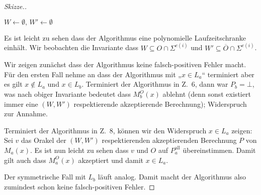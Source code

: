 \documentclass[nofonts]{uebung}
\begin{document}
\begin{proof}[Skizze.]
    \noindent%
    \begin{algorithm}[H]
        \;
        $W\gets\emptyset,\, W'\gets\emptyset$\;
    \end{algorithm}
Es ist leicht zu sehen dass der Algorithmus eine polynomielle Laufzeitschranke einhält.
Wir beobachten die Invariante dass $W\subseteq O\cap\Sigma^{e(i)}$ und $W'\subseteq \overline{O}\cap\Sigma^{e(i)}$. 

Wir zeigen zunächst dass der Algorithmus keine falsch-positiven Fehler macht.
Für den ersten Fall nehme an dass der Algorithmus mit „$x\in L_a$“ terminiert aber es gilt $x\not\in L_a$ und $x\in L_b$.
Terminiert der Algorithmus in Z.~6, dann war $P_b=\bot$, was nach obiger Invariante bedeutet dass $M_b^O(x)$ ablehnt (denn sonst existiert immer eine $(W, W')$ respektierende akzeptierende Berechnung); Widerspruch zur Annahme.

Terminiert der Algorithmus in Z.~8, können wir den Widerspruch $x\in L_a$ zeigen: Sei $v$ das Orakel der $(W, W')$ respektierenden akzeptierenden Berechnung $P$ von $M_a(x)$. Es ist nun leicht zu sehen dass $v$ und $O$ auf $P_a^\mathrm{all}$ übereinstimmen. Damit gilt auch dass $M_a^O(x)$ akzeptiert und damit $x\in L_a$.

Der symmetrische Fall mit $L_b$ läuft analog. Damit macht der Algorithmus also zumindest schon keine falsch-positiven Fehler.
\medskip


\end{proof}
\end{document}
